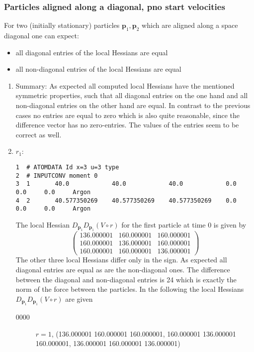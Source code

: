 \documentclass[a4paper]{article}
\newcommand{\boldp}{\boldsymbol{p}}
\begin{document}
\subsubsection{Particles aligned along a diagonal, pno start velocities}
\label{sec-1-4-4}
For two (initially stationary) particles \(\boldp_1, \boldp_2\) which are aligned along a space diagonal one can expect:
\begin{itemize}
\item all diagonal entries of the local Hessians are equal
\item all non-diagonal entries of the local Hessians are equal
\end{itemize}
\begin{enumerate}
\item Summary:
\label{sec-1-4-4-1}
As expected all computed local Hessians have the mentioned symmetric properties, such that all diagonal entries on the one hand and all non-diagonal entries on the other hand are equal.
In contrast to the previous cases no entries are equal to zero which is also quite reasonable, since the difference vector has no zero-entries.
The values of the entries seem to be correct as well.
\item \(r_1\):
\label{sec-1-4-4-2}
\begin{verbatim}
1  # ATOMDATA Id x=3 u=3 type
2  # INPUTCONV moment 0
3  1       40.0            40.0            40.0            0.0     0.0     0.0     Argon
4  2       40.577350269    40.577350269    40.577350269    0.0     0.0     0.0     Argon
\end{verbatim}
The local Hessian \(D_{\boldp_1} D_{\boldp_1} (V\circ r)\) for the first particle at time 0 is given by
\[\begin{pmatrix}
136.000001 & 160.000001 & 160.000001 \\
160.000001 & 136.000001 & 160.000001 \\
160.000001 & 160.000001 & 136.000001
\end{pmatrix}\]
The other three local Hessians differ only in the sign. As expected all diagonal entries are equal as are the non-diagonal ones.
The difference between the diagonal and non-diagonal entries is 24 which is exactly the norm of the force between the particles.
In the following the local Hessians \(D_{\boldp_1} D_{\boldp_1} (V\circ r)\) are given
\begin{description}
\item[{0000}] \(r = 1\), (136.000001 160.000001 160.000001, 160.000001 136.000001 160.000001, 136.000001 160.000001 136.000001)

\end{description}
\end{enumerate}
\end{document}
